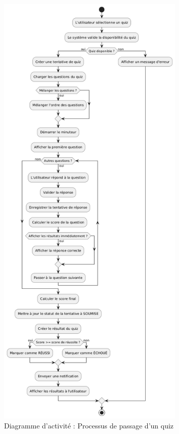 \documentclass[12pt,a4paper]{report}
\begin{document}
\begin{figure}[htbp]
    \centering
    \includegraphics[width=0.8\textwidth]{latex_media/media/activity_diagramme_passer_quiz.png}
    \caption{Diagramme d'activité : Processus de passage d'un quiz}
    \label{fig:activite-passer-quiz}
\end{figure}
\end{document}
